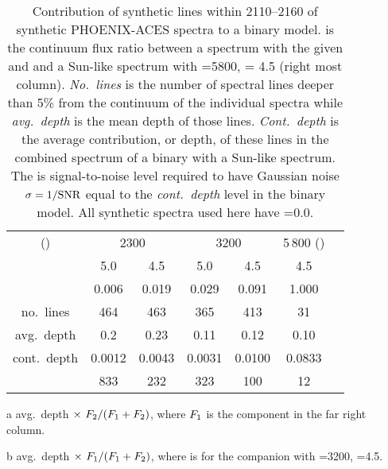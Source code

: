 
\begin{table}
    \small
    \centering
    \begin{threeparttable}[b]
        \caption[Analysis of spectral line depths.]{Contribution of synthetic lines within 2110--2160\nm{} of synthetic {PHOENIX-ACES} spectra to a binary model.
            \FtwoFone{} is the continuum flux ratio between a spectrum with the given \Teff{} and \logg{} and a Sun-like spectrum with \Teff{}=5800, \logg{} = 4.5 (right most column).
            \emph{No.\ lines} is the number of spectral lines deeper than 5\% from the continuum of the individual spectra while \emph{avg.\ depth} is the mean depth of those lines.
            \emph{Cont.\ depth} is the average contribution, or depth, of these lines in the combined spectrum of a binary with a Sun-like spectrum.
            The \snr{} is signal-to-noise level required to have Gaussian noise \(\sigma=1/\textrm{SNR}{}\)  equal to the \emph{cont.\ depth} level in the binary model.
            All synthetic spectra used here have \feh{}=0.0.}
        \begin{tabular}{*7c}
            \toprule
            \Teff{} (\K{}) & \multicolumn{2}{c}{2300} & \multicolumn{2}{c}{3200} & 5\,800 (\Fone{})\\
           \logg{} & 5.0 & 4.5 & 5.0 & 4.5 & 4.5 \\
            \midrule
            \FtwoFone{} & 0.006 & 0.019 & 0.029 & 0.091 & 1.000 \\
            no.\ lines & 464 & 463 & 365 & 413 & 31 \\
            avg.\ depth & 0.2 & 0.23 & 0.11 & 0.12 & 0.10 \\
            cont.\ depth\tnote{a} &  0.0012 & 0.0043 &  0.0031 & 0.0100 &  0.0833\tnote{b} \\
            \snr{} & 833 & 232 & 323 & 100 & 12 \\
            \bottomrule
        \end{tabular}\label{tab:line_contributions}
        \begin{tablenotes}
            \item [a] avg.\ depth \(\times~ {F}_{2}{} / ({F}_{1}{} + {F}_{2}{})\), where \({F}_{1}{}\) is the component in the far right column.
            \item[b] avg.\ depth \(\times~ {F}_{1}{} / ({F}_{1}{} + {F}_{2}{})\), where \Ftwo{} is for the companion with \Teff{}=3200, \logg{}=4.5.
        \end{tablenotes}
    \end{threeparttable}
\end{table}
